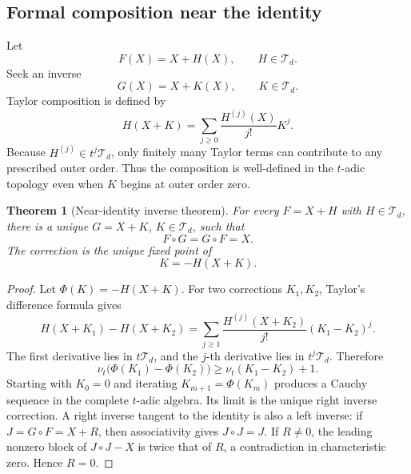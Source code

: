 \documentclass[11pt,a4paper]{article}
\numberwithin{equation}{section}
\newtheorem{theorem}{Theorem}[section]
\theoremstyle{definition}
\theoremstyle{remark}
\newcommand{\Tfield}{\mathscr T}
\newcommand{\val}{\nu}
\begin{document}
\subsection{Formal composition near the identity}

Let
\begin{equation}\label{eq:general-F-near-id}
  F(X)=X+H(X),
  \qquad H\in\Tfield_d.
\end{equation}
Seek an inverse
\begin{equation}\label{eq:general-G-near-id}
  G(X)=X+K(X),
  \qquad K\in\Tfield_d.
\end{equation}
Taylor composition is defined by
\begin{equation}\label{eq:Taylor-composition}
  H(X+K)=\sum_{j\ge0}\frac{H^{(j)}(X)}{j!}K^j.
\end{equation}
Because \(H^{(j)}\in t^j\Tfield_d\), only finitely many Taylor terms can
contribute to any prescribed outer order.  Thus the composition is
well-defined in the \(t\)-adic topology even when \(K\) begins at outer
order zero.

\begin{theorem}[Near-identity inverse theorem]\label{thm:general-near-id}
For every \(F=X+H\) with \(H\in\Tfield_d\), there is a unique
\(G=X+K\), \(K\in\Tfield_d\), such that
\begin{equation}\label{eq:two-sided-general}
  F\circ G=G\circ F=X.
\end{equation}
The correction is the unique fixed point of
\begin{equation}\label{eq:general-fixedpoint}
  K=-H(X+K).
\end{equation}
\end{theorem}

\begin{proof}
Let \(\Phi(K)=-H(X+K)\).  For two corrections \(K_1,K_2\), Taylor's
difference formula gives
\[
 H(X+K_1)-H(X+K_2)
 =\sum_{j\ge1}\frac{H^{(j)}(X+K_2)}{j!}(K_1-K_2)^j.
\]
The first derivative lies in \(t\Tfield_d\), and the \(j\)-th derivative
lies in \(t^j\Tfield_d\).  Therefore
\begin{equation}\label{eq:valuation-gain}
 \val_t\bigl(\Phi(K_1)-\Phi(K_2)\bigr)
 \ge \val_t(K_1-K_2)+1.
\end{equation}
Starting with \(K_0=0\) and iterating \(K_{m+1}=\Phi(K_m)\) produces a
Cauchy sequence in the complete \(t\)-adic algebra.  Its limit is the
unique right inverse correction.  A right inverse tangent to the identity
is also a left inverse: if \(J=G\circ F=X+R\), then associativity gives
\(J\circ J=J\).  If \(R\ne0\), the leading nonzero block of
\(J\circ J-X\) is twice that of \(R\), a contradiction in characteristic
zero.  Hence \(R=0\).
\end{proof}
\end{document}
